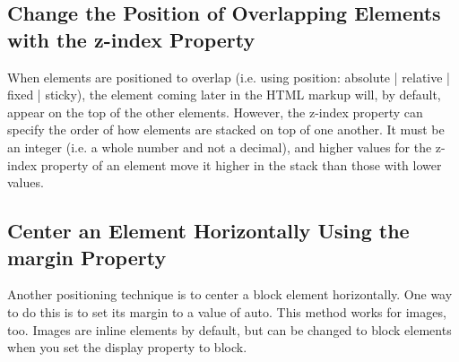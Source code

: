 \documentclass{article}%
\begin{document}
%
\subsection{Change the Position of Overlapping Elements with the z{-}index Property}%
\label{subsec:ChangethePositionofOverlappingElementswiththez{-}indexProperty}%
When elements are positioned to overlap (i.e. using position: absolute | relative | fixed | sticky), the element coming later in the HTML markup will, by default, appear on the top of the other elements. However, the z{-}index property can specify the order of how elements are stacked on top of one another. It must be an integer (i.e. a whole number and not a decimal), and higher values for the z{-}index property of an element move it higher in the stack than those with lower values.\newline%

%
\subsection{Center an Element Horizontally Using the margin Property}%
\label{subsec:CenteranElementHorizontallyUsingthemarginProperty}%
Another positioning technique is to center a block element horizontally. One way to do this is to set its margin to a value of auto.\newline%
This method works for images, too. Images are inline elements by default, but can be changed to block elements when you set the display property to block.\newline%

%
\end{document}
